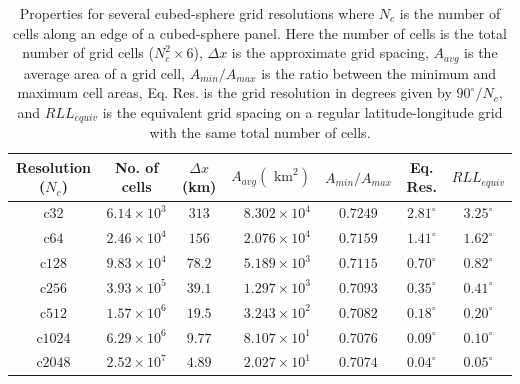 \begin{table}[t]
    \caption{Properties for several cubed-sphere grid resolutions where 
    $N_c$ is the number of cells along an edge of a cubed-sphere panel.
    Here the number of cells is the total number of grid cells 
    ($N_c^2 \times 6$), $\Delta x$ is the approximate grid spacing, 
    $A_{avg}$ is the average area of a grid cell, $A_{min}/A_{max}$ is the
    ratio between the minimum and maximum cell areas, Eq.  Res.  is the
    grid resolution in degrees given by $90^\circ / N_c$, and $RLL_{equiv}$
    is the equivalent grid spacing on a regular latitude-longitude
    grid with the same total number of cells.}%
    \label{tb:grids}
    \begin{center}
    \begin{tabular}{cccrccc}
            \hline
            Resolution ($N_c$) & No. of cells       & $\Delta x$ (km) & $A_{avg} (\mbox{ km}^2)$ & $A_{min}/A_{max}$ & Eq. Res.     & $RLL_{equiv}$ \\ 
            \hline
            \hline
            c$32$              & $6.14 \times 10^3$ & $313$           & $8.302 \times 10^{4}$    & $0.7249$          & $2.81^\circ$ & $3.25^\circ$  \\ 
            c$64$              & $2.46 \times 10^4$ & $156$           & $2.076 \times 10^{4}$    & $0.7159$          & $1.41^\circ$ & $1.62^\circ$  \\ 
            c$128$             & $9.83 \times 10^4$ & $78.2$          & $5.189 \times 10^{3}$    & $0.7115$          & $0.70^\circ$ & $0.82^\circ$  \\ 
            c$256$             & $3.93 \times 10^5$ & $39.1$          & $1.297 \times 10^{3}$    & $0.7093$          & $0.35^\circ$ & $0.41^\circ$  \\ 
            c$512$             & $1.57 \times 10^6$ & $19.5$          & $3.243 \times 10^{2}$    & $0.7082$          & $0.18^\circ$ & $0.20^\circ$  \\ 
            c$1024$           & $6.29 \times 10^6$ & $9.77$          & $8.107 \times 10^{1}$    & $0.7076$          & $0.09^\circ$ & $0.10^\circ$  \\ 
            c$2048$           & $2.52 \times 10^7$ & $4.89$          & $2.027 \times 10^{1}$   & $0.7074$          & $0.04^\circ$ & $0.05^\circ$ \\
            \hline
        \end{tabular}
    \end{center}
\end{table}

